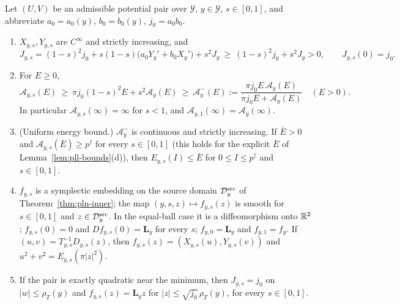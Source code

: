 \begin{lemma}\label{lem:pln-energy}
Let $(U,V)$ be an admissible potential pair over $\mathcal Y$, $y\in\mathcal Y$, $s\in[0,1]$, and abbreviate
$a_0=a_0(y)$, $b_0=b_0(y)$, $j_0=a_0b_0$.
\begin{enumerate}[label=(\alph*)]
\item $X_{y,s},Y_{y,s}$ are $C^\infty$ and strictly increasing, and
 \[
  J_{y,s}=(1-s)^2j_0+s(1-s)\bigl(a_0Y_y'+b_0X_y'\bigr)+s^2J_y\ \ge\ (1-s)^2j_0+s^2J_y>0,\qquad J_{y,s}(0)=j_0 .
 \]
\item For $E\ge0$,
 \[
  \mathcal A_{y,s}(E)\ \ge\ \pi j_0(1-s)^2E+s^2\mathcal A_y(E)\ \ge\ \mathcal A^-_y(E):=\frac{\pi j_0E\,\mathcal A_y(E)}{\pi j_0E+\mathcal A_y(E)}\quad(E>0).
 \]
 In particular $\mathcal A_{y,s}(\infty)=\infty$ for $s<1$, and $\mathcal A_{y,1}(\infty)=\mathcal A_y(\infty)$.
\item (Uniform energy bound.) $\mathcal A^-_y$ is continuous and strictly increasing. If $\bar E>0$ and
 $\mathcal A_{y,s}(\bar E)\ge p^\dagger$ for every $s\in[0,1]$ (this holds for the explicit $\bar E$ of
 Lemma~\ref{lem:pll-bounds}(d)), then $E_{y,s}(I)\le\bar E$ for
 $0\le I\le p^\dagger$ and $s\in[0,1]$.
\item $f_{y,s}$ is a symplectic embedding on the source domain $\mathcal D_y^{\rm src}$ of Theorem~\ref{thm:pln-inner}; the map $(y,s,z)\mapsto f_{y,s}(z)$ is smooth for $s\in[0,1]$ and $z\in\mathcal D_y^{\rm src}$. In the equal-ball case it is a diffeomorphism onto $\mathbb{R}^2$; $f_{y,s}(0)=0$ and $Df_{y,s}(0)=\mathbf L_y$ for every $s$;
 $f_{y,0}=\mathbf L_y$ and $f_{y,1}=f_y$. If $(u,v)=T_{y,s}^{-1}D_{y,s}(z)$, then $f_{y,s}(z)=(X_{y,s}(u),Y_{y,s}(v))$ and
 $u^2+v^2=E_{y,s}(\pi|z|^2)$.
\item If the pair is exactly quadratic near the minimum, then $J_{y,s}=j_0$ on $|w|\le\rho_T(y)$ and
 $f_{y,s}(z)=\mathbf L_yz$ for $|z|\le\sqrt{j_0}\,\rho_T(y)$, for every $s\in[0,1]$.
\end{enumerate}
\end{lemma}

